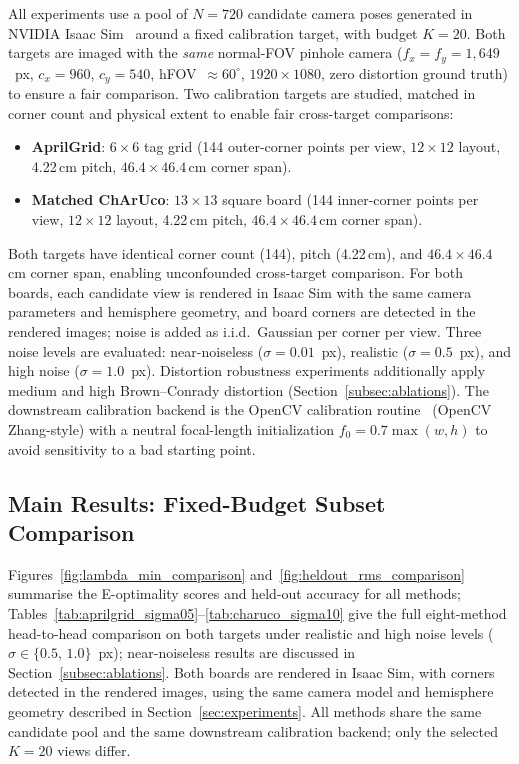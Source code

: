 \documentclass[letterpaper, 9
 pt, conference]{ieeeconf}
\begin{document}
All experiments use a pool of $N = 720$ candidate camera poses generated in
NVIDIA Isaac Sim~\citep{isaacsim} around a fixed calibration target, with budget $K = 20$.
Both targets are imaged with the \emph{same} normal-FOV pinhole camera
($f_x = f_y = 1{,}649$~px, $c_x{=}960$, $c_y{=}540$, hFOV~${\approx}60^\circ$,
$1920\times1080$, zero distortion ground truth) to ensure a fair comparison.
Two calibration targets are studied, matched in corner count and physical extent
to enable fair cross-target comparisons:
\begin{itemize}
    \item \textbf{AprilGrid}: $6{\times}6$ tag grid (144 outer-corner points per
    view, $12{\times}12$ layout, 4.22\,cm pitch, $46.4{\times}46.4$\,cm corner span).
    \item \textbf{Matched ChArUco}: $13{\times}13$ square board (144 inner-corner points per
    view, $12{\times}12$ layout, 4.22\,cm pitch, $46.4{\times}46.4$\,cm corner span).
\end{itemize}
Both targets have identical corner count (144), pitch (4.22\,cm), and
$46.4\times46.4$\,cm corner span, enabling unconfounded cross-target comparison.
For both boards, each candidate view is rendered in Isaac Sim with the same
camera parameters and hemisphere geometry, and board corners are detected in
the rendered images; noise is added as i.i.d.\ Gaussian per corner per view.
Three noise levels are evaluated: near-noiseless ($\sigma = 0.01$~px),
realistic ($\sigma = 0.5$~px), and high noise ($\sigma = 1.0$~px).
Distortion robustness experiments additionally apply medium and high
Brown--Conrady distortion (Section~\ref{subsec:ablations}).
The downstream calibration backend is the OpenCV calibration routine~\citep{opencv_calib} (OpenCV
Zhang-style) with a neutral focal-length initialization
$f_0 = 0.7\max(w,h)$ to avoid sensitivity to a bad starting point.

\subsection{Main Results: Fixed-Budget Subset Comparison}
\label{subsec:fixed_backend}

Figures~\ref{fig:lambda_min_comparison} and~\ref{fig:heldout_rms_comparison}
summarise the E-optimality scores and held-out accuracy for all methods;
Tables~\ref{tab:aprilgrid_sigma05}--\ref{tab:charuco_sigma10} give the full
eight-method head-to-head comparison on both targets under realistic and high
noise levels ($\sigma \in \{0.5,\,1.0\}$~px); near-noiseless results are
discussed in Section~\ref{subsec:ablations}.
Both boards are rendered in Isaac Sim, with corners detected in the rendered
images, using the same camera model and hemisphere geometry described in Section~\ref{sec:experiments}.
All methods share the same candidate pool and the same downstream calibration
backend; only the selected $K{=}20$ views differ.
\end{document}
